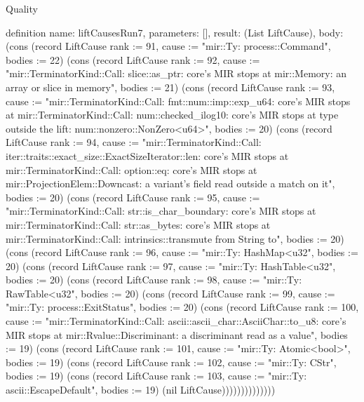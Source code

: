 \begin{lexlean}{Quality}
\begin{semanticmodule}
definition{
  name: liftCausesRun7,
  parameters: [],
  result: (List LiftCause),
  body: (cons (record LiftCause {rank := 91, cause := "mir::Ty: process::Command", bodies := 22}) (cons (record LiftCause {rank := 92, cause := "mir::TerminatorKind::Call: slice::as_ptr: core's MIR stops at mir::Memory: an array or slice in memory", bodies := 21}) (cons (record LiftCause {rank := 93, cause := "mir::TerminatorKind::Call: fmt::num::imp::exp_u64: core's MIR stops at mir::TerminatorKind::Call: num::checked_ilog10: core's MIR stops at type outside the lift: num::nonzero::NonZero<u64>", bodies := 20}) (cons (record LiftCause {rank := 94, cause := "mir::TerminatorKind::Call: iter::traits::exact_size::ExactSizeIterator::len: core's MIR stops at mir::TerminatorKind::Call: option::eq: core's MIR stops at mir::ProjectionElem::Downcast: a variant's field read outside a match on it", bodies := 20}) (cons (record LiftCause {rank := 95, cause := "mir::TerminatorKind::Call: str::is_char_boundary: core's MIR stops at mir::TerminatorKind::Call: str::as_bytes: core's MIR stops at mir::TerminatorKind::Call: intrinsics::transmute from String to", bodies := 20}) (cons (record LiftCause {rank := 96, cause := "mir::Ty: HashMap<u32", bodies := 20}) (cons (record LiftCause {rank := 97, cause := "mir::Ty: HashTable<u32", bodies := 20}) (cons (record LiftCause {rank := 98, cause := "mir::Ty: RawTable<u32", bodies := 20}) (cons (record LiftCause {rank := 99, cause := "mir::Ty: process::ExitStatus", bodies := 20}) (cons (record LiftCause {rank := 100, cause := "mir::TerminatorKind::Call: ascii::ascii_char::AsciiChar::to_u8: core's MIR stops at mir::Rvalue::Discriminant: a discriminant read as a value", bodies := 19}) (cons (record LiftCause {rank := 101, cause := "mir::Ty: Atomic<bool>", bodies := 19}) (cons (record LiftCause {rank := 102, cause := "mir::Ty: CStr", bodies := 19}) (cons (record LiftCause {rank := 103, cause := "mir::Ty: ascii::EscapeDefault", bodies := 19}) (nil LiftCause))))))))))))))
}


\end{semanticmodule}
\end{lexlean}
